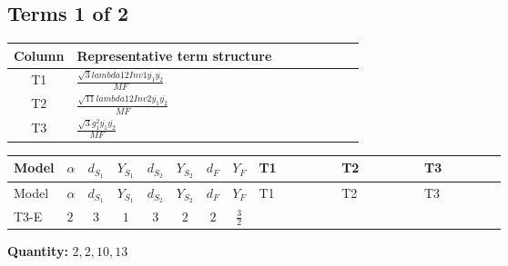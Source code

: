 \documentclass[8pt]{article}
\begin{document}
\begin{landscape}
\subsection*{Terms 1 of 2}
\begin{center}
\begin{tabular}{@{}c >{\raggedright\arraybackslash}p{0.82\linewidth}@{}}
\toprule
Column & Representative term structure \\
\midrule
T1 & \(\displaystyle \frac{\sqrt{3} lambda12Inv1 \overline{y_{1}} \overline{y_{2}}}{MF}\) \\
\midrule
T2 & \(\displaystyle \frac{\sqrt{11} lambda12Inv2 \overline{y_{1}} \overline{y_{2}}}{MF}\) \\
\midrule
T3 & \(\displaystyle \frac{\sqrt{3} g_{1}^{2} \overline{y_{1}} \overline{y_{2}}}{MF}\) \\
\midrule
\bottomrule
\end{tabular}
\end{center}
\smallskip
\tiny
\begin{longtable}{@{}llcccccc >{\raggedright\arraybackslash}p{0.21\linewidth} >{\raggedright\arraybackslash}p{0.21\linewidth} >{\raggedright\arraybackslash}p{0.21\linewidth}@{}}
\toprule
Model & $\alpha$ & $d_{S_1}$ & $Y_{S_1}$ & $d_{S_2}$ & $Y_{S_2}$ & $d_F$ & $Y_F$ & T1 & T2 & T3 \\
\midrule
\endfirsthead
\toprule
Model & $\alpha$ & $d_{S_1}$ & $Y_{S_1}$ & $d_{S_2}$ & $Y_{S_2}$ & $d_F$ & $Y_F$ & T1 & T2 & T3 \\
\midrule
\endhead
T3-E & $2$ & $3$ & $1$ & $3$ & $2$ & $2$ & $\frac{3}{2}$ & \scriptsize\adjustbox{max width=\linewidth}{$\begin{gathered} - \frac{\sqrt{3} lambda12Inv1 \overline{y_{1}} \overline{y_{2}}}{6 MF}\end{gathered}$} & \scriptsize\adjustbox{max width=\linewidth}{$\begin{gathered} \frac{3 \sqrt{11} lambda12Inv2 \overline{y_{1}} \overline{y_{2}}}{22 MF}\end{gathered}$} & \scriptsize\adjustbox{max width=\linewidth}{$\begin{gathered} \frac{9 \sqrt{3} g_{1}^{2} \overline{y_{1}} \overline{y_{2}}}{8 MF}\end{gathered}$} \\
\midrule
\bottomrule
\end{longtable}
\clearpage
\noindent\textbf{Quantity: }$\mathrm{2,2,10,13}$\par\smallskip

\end{landscape}
\end{document}
